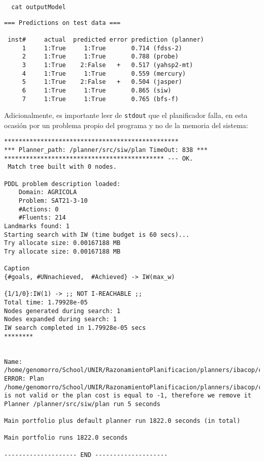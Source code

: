 \documentclass[a4paper,12pt,twocolumn]{article}
\begin{document}
\begin{lstlisting}
  cat outputModel
\end{lstlisting}
\begin{lstlisting}[style=consola]
=== Predictions on test data ===

 inst#     actual  predicted error prediction (planner)
     1     1:True     1:True       0.714 (fdss-2)
     2     1:True     1:True       0.788 (probe)
     3     1:True    2:False   +   0.517 (yahsp2-mt)
     4     1:True     1:True       0.559 (mercury)
     5     1:True    2:False   +   0.504 (jasper)
     6     1:True     1:True       0.865 (siw)
     7     1:True     1:True       0.765 (bfs-f)
\end{lstlisting}


Adicionalmente, es importante leer de \texttt{stdout} que el planificador falla, en esta ocasión por un problema propio del programa y no de la memoria del sistema:

\begin{lstlisting}[style=consola]
************************************************
*** Planner_path: /planner/src/siw/plan TimeOut: 838 ***
******************************************** --- OK.
 Match tree built with 0 nodes.

PDDL problem description loaded: 
	Domain: AGRICOLA
	Problem: SAT21-3-10
	#Actions: 0
	#Fluents: 214
Landmarks found: 1
Starting search with IW (time budget is 60 secs)...
Try allocate size: 0.00167188 MB
Try allocate size: 0.00167188 MB

Caption
{#goals, #UNnachieved,  #Achieved} -> IW(max_w)

{1/1/0}:IW(1) -> ;; NOT I-REACHABLE ;;
Total time: 1.79928e-05
Nodes generated during search: 1
Nodes expanded during search: 1
IW search completed in 1.79928e-05 secs
********


Name: /home/genomorro/School/UNIR/RazonamientoPlanificacion/planners/ibacop/cleaned_result.result
ERROR: Plan /home/genomorro/School/UNIR/RazonamientoPlanificacion/planners/ibacop/cleaned_result.result is not valid or the plan cost is equal to -1, therefore we remove it
Planner /planner/src/siw/plan run 5 seconds

Main portfolio plus default planner run 1822.0 seconds (in total)

Main portfolio runs 1822.0 seconds

-------------------- END --------------------
\end{lstlisting}
\end{document}

